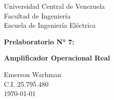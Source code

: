 \begin{titlepage}
    \centering
    \Large
    Universidad Central de Venezuela\\
    Facultad de Ingeniería\\
    Escuela de Ingeniería Eléctrica
    \vspace*{8cm}

    \Huge
    \textbf{Prelaboratorio N° 7: } 

    \textbf{Amplificador Operacional Real}
    \vfill


    \Large

    Emerson Warhman \\
    C.I. 25.795.480 \\
    \today

\end{titlepage}